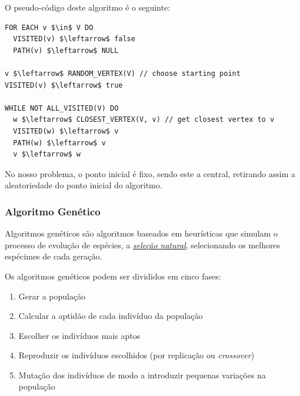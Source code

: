 \documentclass[article, a4paper, 12pt, oneside]{memoir}
\begin{document}
O pseudo-código deste algoritmo é o seguinte:
\begin{lstlisting}[frame=single, mathescape=true]
FOR EACH v $\in$ V DO
  VISITED(v) $\leftarrow$ false
  PATH(v) $\leftarrow$ NULL

v $\leftarrow$ RANDOM_VERTEX(V) // choose starting point
VISITED(v) $\leftarrow$ true

WHILE NOT ALL_VISITED(V) DO
  w $\leftarrow$ CLOSEST_VERTEX(V, v) // get closest vertex to v
  VISITED(w) $\leftarrow$ v
  PATH(w) $\leftarrow$ v
  v $\leftarrow$ w
\end{lstlisting}

No nosso problema, o ponto inicial é fixo, sendo este a central, retirando assim a aleatoriedade do ponto inicial do algoritmo.

\subsubsection{Algoritmo Genético}
Algoritmos genéticos são algoritmos baseados em heurísticas que simulam o processo de evolução de espécies, a \href{https://en.wikipedia.org/wiki/Natural_selection}{\emph{seleção natural}}, selecionando os melhores espécimes de cada geração.

Os algoritmos genéticos podem ser divididos em cinco fases:
\begin{enumerate}
	\item Gerar a população
	\item Calcular a aptidão de cada indivíduo da população
	\item Escolher os indivíduos mais aptos
	\item Reproduzir os indivíduos escolhidos (por replicação ou \emph{crossover})
	\item Mutação dos indivíduos de modo a introduzir pequenas variações na população
\end{enumerate}
\end{document}
